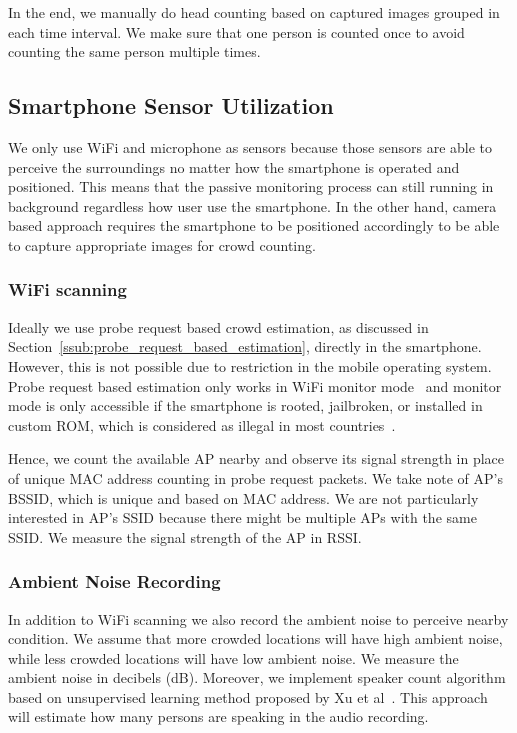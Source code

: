 	In the end, we manually do head counting based on captured images grouped in each time interval. We make sure that one person is counted once to avoid counting the same person multiple times.

\subsection{Smartphone Sensor Utilization} %
\label{sub:smartphone_sensor_utilization}
We only use WiFi and microphone as sensors because those sensors are able to perceive the surroundings no matter how the smartphone is operated and positioned. This means that the passive monitoring process can still running in background regardless how user use the smartphone. In the other hand, camera based approach requires the smartphone to be positioned accordingly to be able to capture appropriate images for crowd counting.

	\subsubsection{WiFi scanning} %
	\label{ssub:wifi_scanning}
	Ideally we use probe request based crowd estimation, as discussed in Section~\ref{ssub:probe_request_based_estimation}, directly in the smartphone. However, this is not possible due to restriction in the mobile operating system. Probe request based estimation only works in WiFi monitor mode~\cite{thesis052,thesis079} and monitor mode is only accessible if the smartphone is rooted, jailbroken, or installed in custom \ac{ROM}, which is considered as illegal in most countries~\cite{rootjailbreak}.
	
	Hence, we count the available \ac{AP} nearby and observe its signal strength in place of unique \ac{MAC} address counting in probe request packets. We take note of \ac{AP}'s \ac{BSSID}, which is unique and based on \ac{MAC} address. We are not particularly interested in \ac{AP}'s \ac{SSID} because there might be multiple \ac{AP}s with the same \ac{SSID}. We measure the signal strength of the \ac{AP} in \ac{RSSI}.

	\subsubsection{Ambient Noise Recording} %
	\label{ssub:ambient_noise_recording}
	In addition to WiFi scanning we also record the ambient noise to perceive nearby condition. We assume that more crowded locations will have high ambient noise, while less crowded locations will have low ambient noise. We measure the ambient noise in decibels (dB). Moreover, we implement speaker count algorithm based on unsupervised learning method proposed by Xu et al~\cite{thesis067}. This approach will estimate how many persons are speaking in the audio recording.

